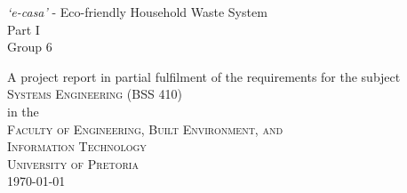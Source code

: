 \thispagestyle{empty}
\begin{center}
{\huge \textit{`e-casa'} - Eco-friendly Household Waste System\\Part I}
\vspace{20mm} \\
{\Large Group 6}
\vfill

A project report in partial fulfilment of the requirements for the subject\\
\vspace{10mm}
{\Large \textsc{Systems Engineering (BSS 410)}} \\
\vfill
%
in the \\
\vspace{20mm}
%
{\Large \textsc{Faculty of Engineering, Built Environment, and \\ 
Information Technology}}\\
%
\vspace{10mm}
{\Large\textsc{University of Pretoria}} \\
%
\vfill
%
\today
\end{center}
